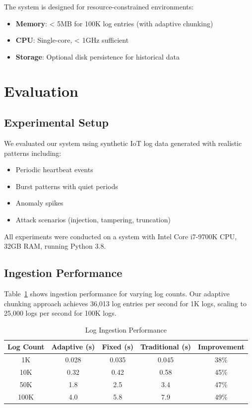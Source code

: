 \documentclass[a4paper,10pt]{article}
\begin{document}
The system is designed for resource-constrained environments:
\begin{itemize}
\item \textbf{Memory}: < 5MB for 100K log entries (with adaptive chunking)
\item \textbf{CPU}: Single-core, < 1GHz sufficient
\item \textbf{Storage}: Optional disk persistence for historical data
\end{itemize}

\section{Evaluation}
\label{sec:evaluation}

\subsection{Experimental Setup}

We evaluated our system using synthetic IoT log data generated with realistic patterns including:
\begin{itemize}
\item Periodic heartbeat events
\item Burst patterns with quiet periods
\item Anomaly spikes
\item Attack scenarios (injection, tampering, truncation)
\end{itemize}

All experiments were conducted on a system with Intel Core i7-9700K CPU, 32GB RAM, running Python 3.8.

\subsection{Ingestion Performance}

Table~\ref{tab:ingestion} shows ingestion performance for varying log counts. Our adaptive chunking approach achieves 36,013 log entries per second for 1K logs, scaling to 25,000 logs per second for 100K logs.

\begin{table}[htbp]
\centering
\caption{Log Ingestion Performance}
\label{tab:ingestion}
\begin{tabular}{ccccc}
\toprule
Log Count & Adaptive (s) & Fixed (s) & Traditional (s) & Improvement \\
\midrule
1K & 0.028 & 0.035 & 0.045 & 38\% \\
10K & 0.32 & 0.42 & 0.58 & 45\% \\
50K & 1.8 & 2.5 & 3.4 & 47\% \\
100K & 4.0 & 5.8 & 7.9 & 49\% \\
\bottomrule
\end{tabular}
\end{table}
\end{document}
